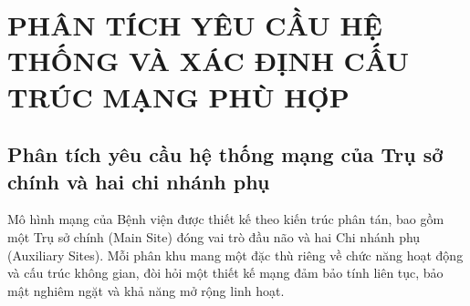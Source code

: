 \section{PHÂN TÍCH YÊU CẦU HỆ THỐNG VÀ XÁC ĐỊNH CẤU TRÚC MẠNG PHÙ HỢP}

\subsection{Phân tích yêu cầu hệ thống mạng của Trụ sở chính và hai chi nhánh phụ}
Mô hình mạng của Bệnh viện được thiết kế theo kiến trúc phân tán, bao gồm một Trụ sở chính (Main Site) đóng vai trò đầu não và hai Chi nhánh phụ (Auxiliary Sites). Mỗi phân khu mang một đặc thù riêng về chức năng hoạt động và cấu trúc không gian, đòi hỏi một thiết kế mạng đảm bảo tính liên tục, bảo mật nghiêm ngặt và khả năng mở rộng linh hoạt.

